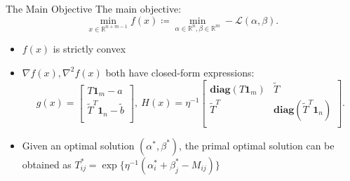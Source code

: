 \begin{frame}{The Main Objective}
    The main objective:
    \begin{equation}
    \label{eq:main}
        \min_{x\in\mathbb{R}^{n+m-1}} f(x) \coloneqq \min_{\alpha \in \mathbb{R}^{n}, \beta \in \mathbb{R}^{m}} -\mathcal{L}(\alpha, \beta).
    \end{equation}

    \begin{itemize}
        \item $f(x)$ is strictly convex
        \item $\nabla f(x), \nabla^2f(x)$ both have closed-form expressions:
        \begin{equation*}
        \label{eq:derivatives}
            g(x) = \begin{bmatrix}
                T \mathbf{1}_m - a \\
                \tilde{T}^T \mathbf{1}_n - \tilde{b} \\
            \end{bmatrix},\ 
            H(x) = \eta^{-1}\begin{bmatrix}
                \mathbf{diag}(T \mathbf{1}_m) & \tilde{T} \\
                \tilde{T}^{T} & \mathbf{diag}(\tilde{T}^{T} \mathbf{1}_n) \\
            \end{bmatrix}.
        \end{equation*}
        \item Given an optimal solution $(\alpha^*,\beta^*)$, the primal optimal solution can be obtained as $T_{ij}^*=\exp\{ \eta^{-1}(\alpha_i^* + \beta_j^* - M_{ij}) \}$
    \end{itemize}
\end{frame}